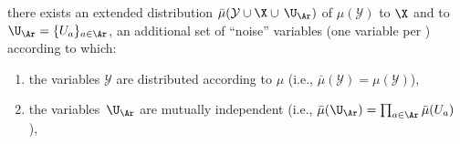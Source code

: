 \begin{defn}[\scibility]
    there exists an extended distribution
    $\bar\mu(\mathcal Y \cup \X \cup \,\U_{\Ar})$
    of $\mu(\mathcal Y)$ to 
    $\X$ and
    to\, $\U_{\Ar} = \{ U_a \}_{a \in \Ar}$,
    an additional set of ``noise'' variables 
    (one variable per \arc)
    according to which:
\begin{enumerate}[label=(\alph*),itemsep=0pt,topsep=0.0ex,parsep=0.5ex]
\item 
    the variables $\mathcal Y$ are distributed according to $\mu$
    \hfill(i.e., $\bar\mu(\mathcal Y) = \mu(\mathcal Y)$),
\item
the variables\, $\U_{\Ar} $ are mutually independent
    \hfill (i.e., $\bar\mu(\U_{\Ar} ) = \prod_{a \in \Ar} \bar\mu(U_a)$ ),

\end{enumerate}
\end{defn}
